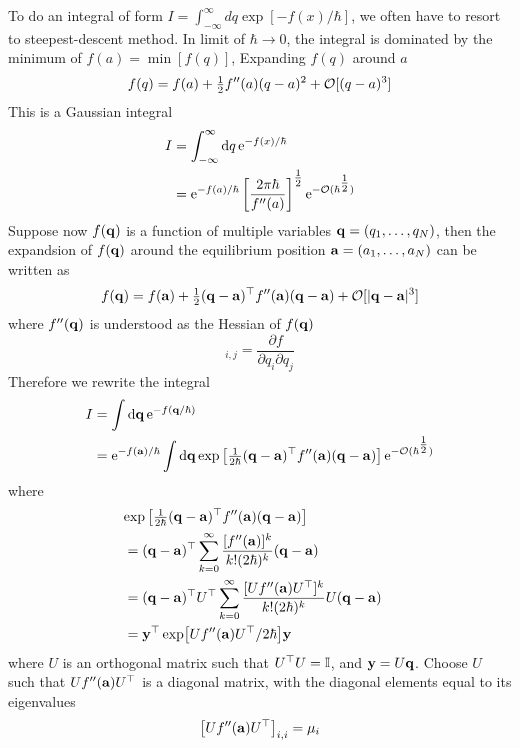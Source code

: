 \documentclass[10pt]{article}
\begin{document}
To do an integral of form $I = \int_{-\infty}^{\infty} dq \exp[-f(x)/\hbar]$, we often have to resort to steepest-descent method. In limit of $\hbar \to 0$, the integral is dominated by the minimum of $f(a) = \min[f(q)]$, Expanding $f(q)$ around $a$
\begin{equation}
	f(q) = f(a)	+ \tfrac{1}{2} f''(a) (q-a)^2 + {\mathcal{O}}[(q-a)^3]
\end{equation}
This is a Gaussian integral
\begin{align*}
	I &= \int_{-\infty}^{\infty} \dd q \, {\mathrm{e}}^{-f(x)/\hbar} \\
	&= {\mathrm{e}}^{-f(a)/\hbar} \left[\frac{2\pi \hbar}{f''(a)}\right]^{\tfrac{1}{2}} {\mathrm{e}}^{-{\mathcal{O}}(\hbar^{\tfrac{1}{2}})}
\end{align*}
Suppose now $f({\bf q})$ is a function of multiple variables ${\bf q} = (q_1, \dots, q_N)$, then the expandsion of $f({\bf q})$ around the equilibrium position ${\bf a} = (a_1, \dots, a_N)$ can be written as
\begin{equation}
	f({\bf q}) = f({\bf a}) + \tfrac{1}{2} ({\bf q} - {\bf a})^\top f''({\bf a}) ({\bf q} - {\bf a}) + {\mathcal{O}}[|{\bf q} - {\bf a}|^3]
\end{equation}
where $f''({\bf q})$ is understood as the Hessian of $f({\bf q})$
\begin{equation}
	[f''(\bfq)]_{i,j} = \frac{\partial f}{\partial q_i \partial q_j}
\end{equation}
Therefore we rewrite the integral
\begin{align*}
	I &= \int \dd \bfq \, \e^{-f(\bfq/\hbar)}\\
	&= \e^{-f(\bfa)/\hbar} \int \dd \bfq \exp\left[ \tfrac{1}{2\hbar} (\bfq - \bfa)^\top f''(\bfa) (\bfq - \bfa) \right] \e^{-\mcO(\hbar^{\thalf})}
\end{align*}
where
\begin{align*}
	\lefteqn{\exp \left[ \tfrac{1}{2\hbar} (\bfq - \bfa)^\top f''(\bfa) (\bfq - \bfa) \right]} \\
	&= (\bfq - \bfa)^\top \sum_{k=0}^{\infty} \frac{[f''(\bfa)]^k}{k! (2\hbar)^k} (\bfq - \bfa)\\
	&= (\bfq - \bfa)^\top U^\top \sum_{k=0}^{\infty} \frac{[U f''(\bfa) U^\top]^k}{k! (2\hbar)^k} U(\bfq - \bfa)\\
	&= \bfy^\top \exp [U f''(\bfa) U^\top/2\hbar] \bfy
\end{align*}
where $U$ is an orthogonal matrix such that $U^\top U = {\mathbb{I}}$, and ${\bf y} = U {\bf q}$. Choose $U$ such that $Uf''({\bf a})U^\top$ is a diagonal matrix, with the diagonal elements equal to its eigenvalues
\begin{equation}
	\left[Uf''({\bf a})U^\top\right]_{i,i} = \mu_i
\end{equation}
\end{document}

